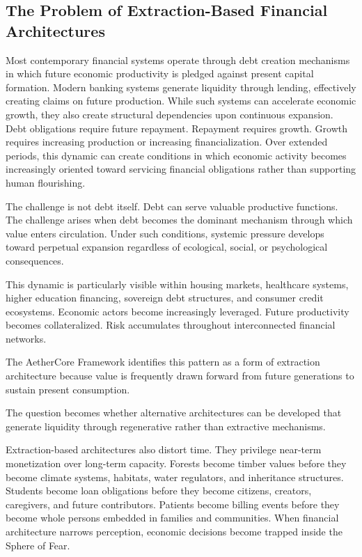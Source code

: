 \documentclass[12pt]{article}
\begin{document}

\subsection{The Problem of Extraction-Based Financial Architectures}

Most contemporary financial systems operate through debt creation mechanisms in which future economic productivity is pledged against present capital formation. Modern banking systems generate liquidity through lending, effectively creating claims on future production. While such systems can accelerate economic growth, they also create structural dependencies upon continuous expansion. Debt obligations require future repayment. Repayment requires growth. Growth requires increasing production or increasing financialization. Over extended periods, this dynamic can create conditions in which economic activity becomes increasingly oriented toward servicing financial obligations rather than supporting human flourishing.

The challenge is not debt itself. Debt can serve valuable productive functions. The challenge arises when debt becomes the dominant mechanism through which value enters circulation. Under such conditions, systemic pressure develops toward perpetual expansion regardless of ecological, social, or psychological consequences.

This dynamic is particularly visible within housing markets, healthcare systems, higher education financing, sovereign debt structures, and consumer credit ecosystems. Economic actors become increasingly leveraged. Future productivity becomes collateralized. Risk accumulates throughout interconnected financial networks.

The AetherCore Framework identifies this pattern as a form of extraction architecture because value is frequently drawn forward from future generations to sustain present consumption.

The question becomes whether alternative architectures can be developed that generate liquidity through regenerative rather than extractive mechanisms.

Extraction-based architectures also distort time. They privilege near-term monetization over long-term capacity. Forests become timber values before they become climate systems, habitats, water regulators, and inheritance structures. Students become loan obligations before they become citizens, creators, caregivers, and future contributors. Patients become billing events before they become whole persons embedded in families and communities. When financial architecture narrows perception, economic decisions become trapped inside the Sphere of Fear.
\end{document}
